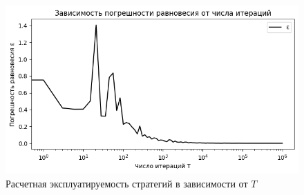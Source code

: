 \begin{figure}[H]
	\centering
	\includegraphics[width=0.8\linewidth]{inc/img/c3e1}
	\caption{Расчетная эксплуатируемость стратегий в зависимости от $T$}
	\label{fig:c3e1}
\end{figure}